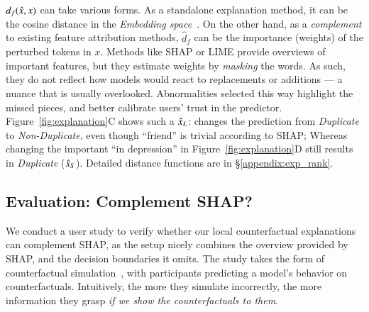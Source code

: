 $d_f(\hat{x}, x)$ can take various forms. 
As a standalone explanation method, it can be the cosine distance in the \emph{Embedding space}~\cite{reimers-2019-sentence-bert}.
On the other hand, as a \emph{complement} to existing feature attribution methods, $\hat{d}_f$ can be the importance (weights) of the perturbed tokens in $x$.
Methods like SHAP or LIME provide overviews of important features, but they estimate weights by \emph{masking} the words.
As such, they do not reflect how models would react to replacements or additions --- a nuance that is usually overlooked.
Abnormalities selected this way highlight the missed pieces, and better calibrate users' trust in the predictor. 
Figure~\ref{fig:explanation}C shows such a $\hat{x}_L$:  changes the prediction from \emph{Duplicate} to \emph{Non-Duplicate}, even though ``friend'' is trivial according to SHAP; Whereas changing the important ``in depression'' in Figure~\ref{fig:explanation}D still results in \emph{Duplicate} ($\hat{x}_S$).
Detailed distance functions are in \S\ref{appendix:exp_rank}.



\subsection{Evaluation: Complement SHAP?}
\label{subsec:exp_user_study}

We conduct a user study to verify whether our local counterfactual explanations can complement SHAP, as the setup nicely combines the overview provided by SHAP, and the decision boundaries it omits.
The study takes the form of counterfactual simulation~\cite{hase2020evaluating}, with participants predicting a model's behavior on counterfactuals.
Intuitively, the more they simulate incorrectly, the more information they grasp \emph{if we show the counterfactuals to them}.

